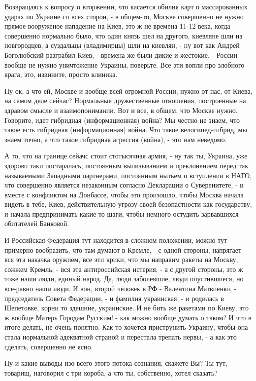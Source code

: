 Возвращаясь к вопросу о вторжении, что касается обилия карт о массированных
ударах по Украине со всех сторон, -  в общем-то, Москве совершенно не нужно
прямое вооруженое нападение на Киев, это ж не времена 11-12 века, когда
совершенно нормально было, что один князь шел на другого, киевляне шли на
новгородцев, а суздальцы (владимирцы) шли на киевлян, - ну вот как Андрей
Боголюбский разграбил Киев, - времена же были дикие и жестокие, - России вообще
не нужно уничтожение Украины, поверьте. Все эти вопли про злобного врага, это,
извините, просто клиника. 

Ну ок, а что ей, Москве и вообще всей огромной России, нужно от нас, от Киева,
на самом деле сейчас?  Нормальные дружественные отношения, построенные на
здравом смысле и взаимопонимании. Вот и все, в общем, что Москве нужно.
Говорите, идет гибридная (информационная) война? Мы честно не знаем, что такое
есть гибридная (информационная) война. Что такое велосипед-гибрид, мы знаем
точно, а что такое гибридная агрессия (война), - это нам неведомо. 

А то, что на границе сейачс стоит стотысячная армия, - ну так ты, Украина, уже
здорово таки постаралась, постоянным вылизыванием и преклонением перед так
называемыми Западными партнерами, постоянным нытьем о вступлении в НАТО, что
совершенно является незаконным согласно Декларации о Суверенитете, - и вместе с
конфликтом на Донбассе, чтобы это произошло, чтобы Москва начала видеть в тебе,
Киев, действительную угрозу своей безопастности как государству, и начала
предпринимать какие-то шаги, чтобы немного остудить зарвавшихся обитателей
Банковой.

И Российская Федерация тут находится в сложном положении, можно тут примерно
вообразить, что там думают в Кремле, - с одной стороны, напрягает вся эта
накачка оружием, все эти крики, что мы направим ракеты на Москву, сожжем
Кремль, - вся эта антироссийская истерия, - а с другой стороны, это ж тоже наши
люди, единый народ. Да, люди заболевшие, люди опустившиеся, но все-равно наши
люди.  И вон, второй человек в РФ - Валентина Матвиенко, - председатель Совета
Федерации, - и фамилия украинская, - и родилась в Шепетовке, корни то здешние,
украинские. И не бить же ракетами по Киеву, это ж вообще Матерь Городам
Русским! - как можно вообще думать о таком? И что в итоге делать, не очень
понятно. Как-то хочется приструнить Украину, чтобы она стала нормальной
адекватной страной и перестала трепать нервы, - а как это сделать, совершенно
не ясно.

Ну и какие выводы изо всего этого потока сознания, скажете Вы? Ты тут, товарищ,
наговорил с три короба, а что ты, собственно, хотел сказать?

